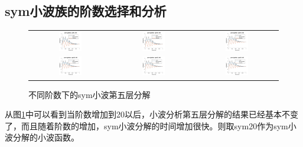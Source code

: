 \subsection{sym小波族的阶数选择和分析}
\begin{figure}[H]
	\centering
	\begin{tabular}{ccc}
		\includegraphics[width=0.3\textwidth]{thesis_figure/ion_chapter/sym5_lvl5}&
		\includegraphics[width=0.3\textwidth]{thesis_figure/ion_chapter/sym10_lvl5}&
		\includegraphics[width=0.3\textwidth]{thesis_figure/ion_chapter/sym15_lvl5}\\
		\includegraphics[width=0.3\textwidth]{thesis_figure/ion_chapter/sym20_lvl5}&
		\includegraphics[width=0.3\textwidth]{thesis_figure/ion_chapter/sym25_lvl5}&
		\includegraphics[width=0.3\textwidth]{thesis_figure/ion_chapter/sym30_lvl5}
	\end{tabular}
	\caption{\label{fig:symvar}不同阶数下的sym小波第五层分解}
\end{figure}
从图\ref{fig:symvar}中可以看到当阶数增加到20以后，小波分析第五层分解的结果已经基本不变了，而且随着阶数的增加，sym小波分解的时间增加很快。则取sym20作为sym小波分解的小波函数。
